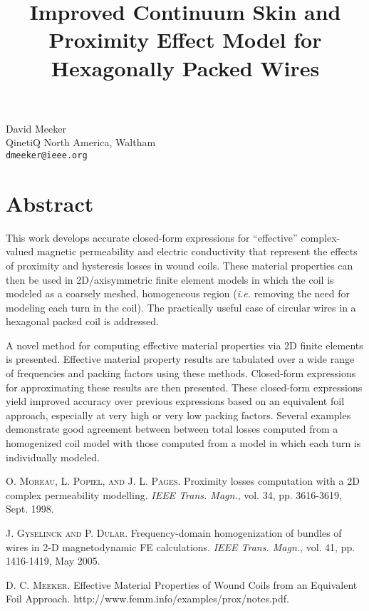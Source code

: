 \title{Improved Continuum Skin and Proximity Effect Model for Hexagonally Packed Wires}
\author{} \institute{}
\maketitle

\begin{center}
{\large David Meeker}\\
QinetiQ North America, Waltham\\
{\tt dmeeker@ieee.org}
\end{center}

\section*{Abstract}
This work develops accurate closed-form expressions for ``effective'' complex-valued magnetic permeability and electric conductivity that represent the effects of proximity and hysteresis losses in wound coils. These material properties can then be used in 2D/axisymmetric finite element models in which the coil is modeled as a coarsely meshed, homogeneous region ({\em i.e.} removing the need for modeling each turn in the coil). The practically useful case of circular wires in a hexagonal packed coil is addressed.

A novel method for computing effective material properties via 2D finite elements is presented. Effective material property results are tabulated over a wide range of frequencies and packing factors using these methods. Closed-form expressions for approximating these results are then presented. These closed-form expressions yield improved accuracy over previous expressions based on an equivalent foil approach, especially at very high or very low packing factors. Several examples demonstrate good agreement between between total losses computed from a homogenized coil model with those computed from a model in which each turn is individually modeled.


\begin{thebibliography}{10}
\textsc{O. Moreau, L. Popiel, and J. L. Pages}. {Proximity losses computation with a 2D complex permeability modelling}. \emph{IEEE Trans. Magn.}, vol. 34, pp. 3616-3619, Sept. 1998.

\textsc{J. Gyselinck and P. Dular}. {Frequency-domain homogenization of bundles of wires in 2-D magnetodynamic FE calculations}. \emph{IEEE Trans. Magn.}, vol. 41, pp. 1416-1419, May 2005.

\textsc{D. C. Meeker}. {Effective Material Properties of Wound Coils from an Equivalent Foil Approach}. {http://www.femm.info/examples/prox/notes.pdf}.
\end{thebibliography}